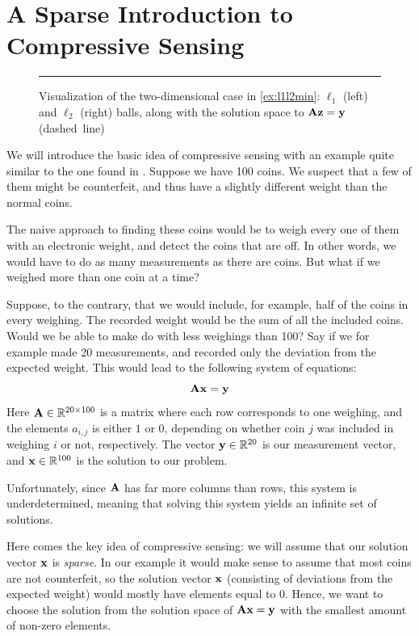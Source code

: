 \chapter{A Sparse Introduction to Compressive Sensing}
\label{sec:basic_cs}
\begin{figure}[t]
	\centering
	
	\caption{Visualization of the two-dimensional case in \cref{ex:l1l2min}: $ \ell_{1} $ (left) and $ \ell_{2} $ (right) balls, along with the solution space to $ \mathbf{A}\mathbf{z} = \mathbf{y} $ (dashed~line)}
	\label{fig:l1l2balls}
	\vspace{4pt}\hrule
\end{figure}
We will introduce the basic idea of compressive sensing with an example quite similar to the one found in \cite{bryan13makingdo}. Suppose we have 100 coins. We suspect that a few of them might be counterfeit, and thus have a slightly different weight than the normal coins. 

The naive approach to finding these coins would be to weigh every one of them with an electronic weight, and detect the coins that are off. In other words, we would have to do as many measurements as there are coins. But what if we weighed more than one coin at a time?

Suppose, to the contrary, that we would include, for example, half of the coins in every weighing. The recorded weight would be the sum of all the included coins. Would we be able to make do with less weighings than 100? Say if we for example made 20 measurements, and recorded only the deviation from the expected weight. This would lead to the following system of equations:
\[
	\mathbf{A}\mathbf{x} = \mathbf{y}
\]
Here $ \mathbf{A} \in \mathbb{R}^{20 \times 100} $ is a matrix where each row corresponds to one weighing, and the elements $ a_{i,j} $ is either $ 1 $ or $ 0 $, depending on whether coin $ j $ was included in weighing $ i $ or not, respectively. The vector $ \mathbf{y} \in \mathbb{R}^{20} $ is our measurement vector, and $ \mathbf{x} \in \mathbb{R}^{100} $ is the solution to our problem. 

Unfortunately, since $ \mathbf{A} $ has far more columns than rows, this system is underdetermined, meaning that solving this system yields an infinite set of solutions. 

Here comes the key idea of compressive sensing: we will assume that our solution vector $ \mathbf{x} $ is \textit{sparse}. In our example it would make sense to assume that most coins are not counterfeit, so the solution vector $ \mathbf{x} $ (consisting of deviations from the expected weight) would mostly have elements equal to $ 0 $. Hence, we want to choose the solution from the solution space of $ \mathbf{A}\mathbf{x} = \mathbf{y} $ with the smallest amount of non-zero elements.

